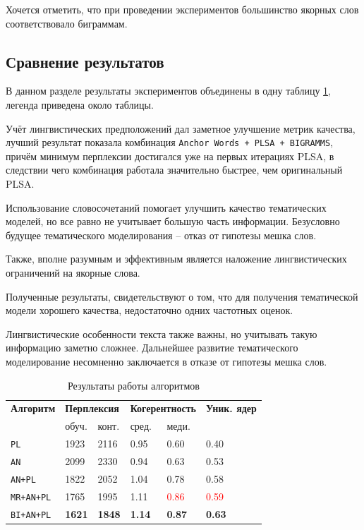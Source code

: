 \documentclass[a4paper, 14pt]{extarticle}
\begin{document}
Хочется отметить, что при проведении экспериментов большинство якорных слов соответствовало биграммам.

\subsection{Сравнение результатов}
	В данном разделе результаты экспериментов объединены в одну таблицу \ref{srt}, легенда приведена около таблицы.
	
	Учёт лингвистических предположений дал заметное улучшение метрик качества, лучший результат показала комбинация \texttt{Anchor Words + PLSA + BIGRAMMS}, причём минимум перплексии достигался уже на первых итерациях PLSA, в следствии чего комбинация работала значительно быстрее, чем оригинальный PLSA. 
	
	Использование словосочетаний помогает улучшить качество тематических моделей, но все равно не учитывает большую часть информации. Безусловно будущее тематического моделирования -- отказ от гипотезы мешка слов. 
	
	Также, вполне разумным и эффективным является наложение лингвистических ограничений на якорные слова. 
	
	Полученные результаты, свидетельствуют о том, что для получения тематической модели хорошего качества, недостаточно одних частотных оценок. 
	
	Лингвистические особенности текста также важны, но учитывать такую информацию заметно сложнее. Дальнейшее развитие тематического моделирование несомненно заключается в отказе от гипотезы мешка слов.
	
	\begin{table}
		\centering
		\caption{Результаты работы алгоритмов}
		\label{srt}
	\begin{tabular}{|l|l|l|l|l|l|}
	\hline
	{\bf Алгоритм} & \multicolumn{2}{l|}{{\bf Перплексия}} & \multicolumn{2}{l|}{{\bf Когерентность}} & {\bf Уник. ядер} \\ \cline{2-5}
 	& обуч. & конт. & сред. & меди. &  \\ \hline
	\texttt{PL} &  1923& 2116&  0.95&   0.60&  0.40\\ \hline
	\texttt{AN} &  2099& 2330&  0.94&   0.63&  0.53\\ \hline
	\texttt{AN+PL} &  1822&  2052& 1.04&  0.78& 0.58\\ \hline
	\texttt{MR+AN+PL} & 1765& 1995& 1.11&  \textcolor{red}{0.86} &  \textcolor{red}{0.59}\\ \hline
	\texttt{BI+AN+PL} & \textbf{1621}& \textbf{1848}& \textbf{1.14}& \textbf{0.87}&  \textbf{0.63}\\ \hline
	\end{tabular}
	\end{table}
\end{document}
